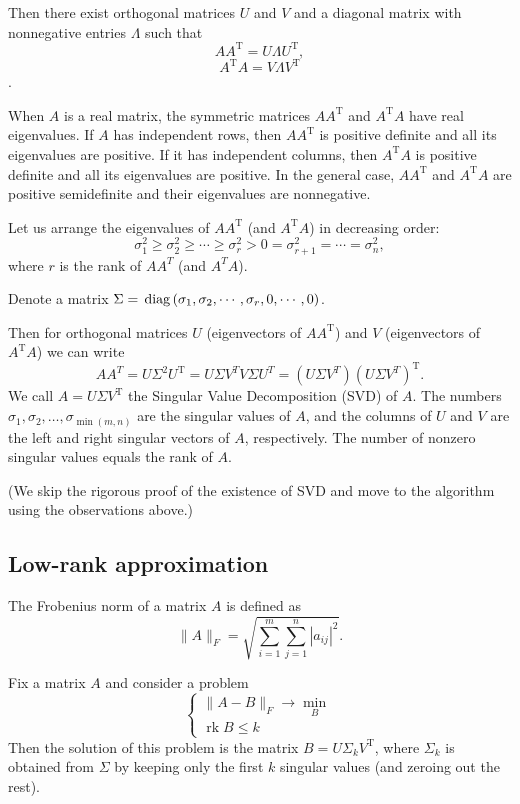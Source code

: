 Then there exist orthogonal matrices $U$ and $V$ and a diagonal matrix with nonnegative entries $\Lambda$ such that
$$
A A^{\mathrm T} = U \Lambda U^{\mathrm T},
$$
$$
A^{\mathrm T} A = V \Lambda V^{\mathrm T}
$$.

When $A$ is a real matrix, the symmetric matrices $A A^{\mathrm T}$ and $A^{\mathrm T} A$ have real eigenvalues. If $A$ has independent rows, then $A A^{\mathrm T}$ is positive definite and all its eigenvalues are positive. If it has independent columns, then $A^{\mathrm T} A$ is positive definite and all its eigenvalues are positive. In the general case, $A A^{\mathrm T}$ and $A^{\mathrm T} A$ are positive semidefinite and their eigenvalues are nonnegative.

Let us arrange the eigenvalues of $A A^{\mathrm T}$ (and $A^{\mathrm T} A$) in decreasing order:
$$
\sigma_1^2 \geqslant \sigma_2^2 \geqslant \cdots \geqslant \sigma_r^2 > 0 = \sigma_{r+1}^2 = \cdots = \sigma_n^2,
$$
where $r$ is the rank of $AA^T$ (and $A^TA$).

Denote a matrix $\Sigma = \,\mathrm{diag}\,(\sigma_1, \sigma_2, \cdots, \sigma_r, 0, \cdots, 0)$.

Then for orthogonal matrices $U$ (eigenvectors of $A A^{\mathrm T}$) and $V$ (eigenvectors of $A^{\mathrm T} A$) we can write
$$
AA^T = U \Sigma^2 U^{\mathrm T} = U\Sigma V^T V\Sigma U^T = (U\Sigma V^T)(U\Sigma V^T)^{\mathrm T}.
$$
We call $A = U \Sigma V^{\mathrm T}$ the Singular Value Decomposition (SVD) of $A$. The numbers $\sigma_1, \sigma_2, \ldots, \sigma_{\min(m,n)}$ are the singular values of $A$, and the columns of $U$ and $V$ are the left and right singular vectors of $A$, respectively. The number of nonzero singular values equals the rank of $A$.

(We skip the rigorous proof of the existence of SVD and move to the algorithm using the observations above.)

\subsection{Low-rank approximation}

\begin{definition}
The Frobenius norm of a matrix $A$ is defined as
$$
\|A\|_F = \sqrt{\sum_{i=1}^m \sum_{j=1}^n |a_{ij}|^2}.
$$
\end{definition}

\begin{theorem}
Fix a matrix $A$ and consider a problem
$$
\left\{\begin{array}{l}
    \|A-B\|_F \rightarrow \min _B \\
    \operatorname{rk} B \leqslant k
    \end{array}\right.
$$
Then the solution of this problem is the matrix $B = U \Sigma_k V^{\mathrm T}$, where $\Sigma_k$ is obtained from $\Sigma$ by keeping only the first $k$ singular values (and zeroing out the rest).
\end{theorem}

